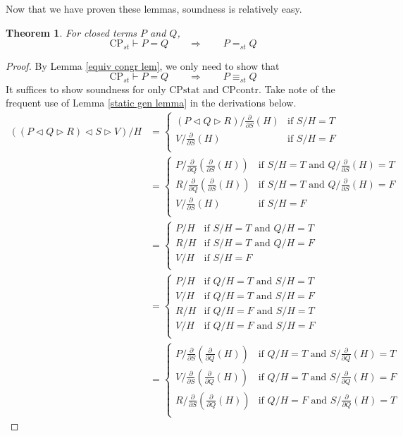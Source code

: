 \documentclass[a4paper,twoside,openright]{report}
\newcommand{\dd}[1]{\frac{\partial}{\partial #1}}
\newcommand{\CPcontr}{\ensuremath{\mathrm{CPcontr}}}
\newcommand{\CPstat}{\ensuremath{\mathrm{CPstat}}}
\newcommand{\lef}{\ensuremath{\triangleleft}}
\newcommand{\rig}{\ensuremath{\triangleright}}
\newtheorem{thm}[theorem]{Theorem}
\begin{document}
Now that we have proven these lemmas, soundness is relatively easy.
\begin{thm}
For closed terms $P$ and $Q$,
\[
\text{CP}_{st}\vdash P=Q\qquad\Longrightarrow\qquad P=_{st}Q
\]
\end{thm}
\begin{proof}
By Lemma \ref{equiv congr lem}, we only need to show that
\[
\text{CP}_{st}\vdash P=Q\qquad\Longrightarrow\qquad P\equiv_{st}Q
\]
It suffices to show soundness for only $\CPstat$ and $\CPcontr$. Take note of the frequent use of Lemma \ref{static gen lemma} in the derivations below.
\begin{align*}
((P\lef Q\rig R)\lef S\rig V)/H
&=\begin{cases}
(P\lef Q\rig R)/\dd S(H) & \text{if $S/H=T$}\\
V/\dd S(H) & \text{if $S/H=F$}\\
\end{cases}\\
&=\begin{cases}
P/\dd Q(\dd S(H)) & \text{if $S/H=T$ and $Q/\dd S(H)=T$}\\
R/\dd Q(\dd S(H)) & \text{if $S/H=T$ and $Q/\dd S(H)=F$}\\
V/\dd S(H) & \text{if $S/H=F$}\\
\end{cases}\\
&=\begin{cases}
P/H & \text{if $S/H=T$ and $Q/H=T$}\\
R/H & \text{if $S/H=T$ and $Q/H=F$}\\
V/H & \text{if $S/H=F$}\\
\end{cases}\\
&=\begin{cases}
P/H & \text{if $Q/H=T$ and $S/H=T$}\\
V/H & \text{if $Q/H=T$ and $S/H=F$}\\
R/H & \text{if $Q/H=F$ and $S/H=T$}\\
V/H & \text{if $Q/H=F$ and $S/H=F$}\\
\end{cases}\\
&=\begin{cases}
P/\dd S(\dd Q(H)) & \text{if $Q/H=T$ and $S/\dd Q(H)=T$}\\
V/\dd S(\dd Q(H)) & \text{if $Q/H=T$ and $S/\dd Q(H)=F$}\\
R/\dd S(\dd Q(H)) & \text{if $Q/H=F$ and $S/\dd Q(H)=T$}\\

\end{cases}
\end{align*}
\end{proof}
\end{document}
